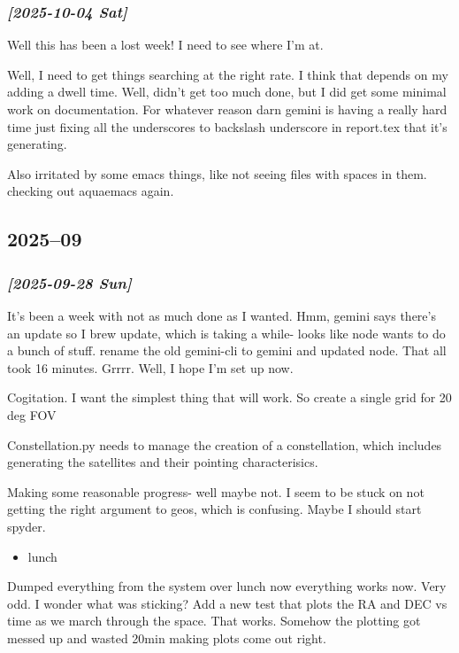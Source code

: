 \documentclass[11pt]{article}
\begin{document}
\subsubsection{\textit{[2025-10-04 Sat]}}
\label{sec:org557c710}
Well this has been a lost week! I need to see where I'm at.

Well, I need to get things searching at the right rate.
I think that depends on my adding a dwell time.
Well, didn't get too much done, but I did get some minimal work on documentation.
For whatever reason darn gemini is having a really hard time just fixing all the
underscores to backslash underscore in report.tex that it's generating.

Also irritated by some emacs things, like not seeing files with spaces
in them. checking out aquaemacs again.


\subsection{2025--09}
\label{sec:org958d1b9}

\subsubsection{\textit{[2025-09-28 Sun]}}
\label{sec:org14ef61b}
It's been a week with not as much done as I wanted.
Hmm, gemini says there's an update so I brew update, which is taking a while- looks
like node wants to do a bunch of stuff.
rename the old gemini-cli to gemini and updated node.  That all took 16 minutes.  Grrrr.
Well, I hope I'm set up now.

Cogitation. I want the simplest thing that will work. So create a single grid for 20 deg FOV

Constellation.py needs to manage the creation of a constellation, which includes
generating the satellites and their pointing characterisics.

Making some reasonable progress- well maybe not. I seem to be stuck on not getting
the right argument to geos, which is confusing. Maybe I should start spyder.

\begin{itemize}
\item lunch
\end{itemize}

Dumped everything from the system over lunch now everything works now.  Very odd.
I wonder what was sticking? Add a new test that plots the RA and DEC vs time as we march
through the space.  That works.  Somehow the plotting got messed up and wasted 20min
making plots come out right.
\end{document}
